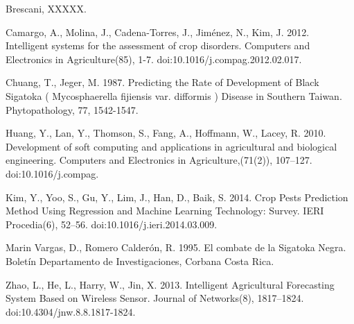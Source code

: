 \documentclass[review]{elsarticle}
\begin{document}
\begin{thebibliography}{1}

 Brescani, XXXXX.

 Camargo, A., Molina, J., Cadena-Torres, J., Jim\'enez, N., Kim, J. 2012. Intelligent systems for the assessment of crop disorders. Computers and Electronics in Agriculture(85), 1-7. doi:10.1016/j.compag.2012.02.017.

 Chuang, T., Jeger, M. 1987. Predicting the Rate of Development of Black Sigatoka ( Mycosphaerella fijiensis var. difformis ) Disease in Southern Taiwan. Phytopathology, 77, 1542-1547.

 Huang, Y., Lan, Y., Thomson, S., Fang, A., Hoffmann, W., Lacey, R. 2010. Development of soft computing and applications in agricultural and biological engineering. Computers and Electronics in Agriculture,(71(2)), 107–127. doi:10.1016/j.compag.

 Kim, Y., Yoo, S., Gu, Y., Lim, J., Han, D.,  Baik, S. 2014. Crop Pests Prediction Method Using Regression and Machine Learning Technology: Survey. IERI Procedia(6), 52–56. doi:10.1016/j.ieri.2014.03.009.

 Marin Vargas, D., Romero Calderón, R. 1995. El combate de la Sigatoka Negra. Bolet\'in Departamento de Investigaciones, Corbana Costa Rica.

Zhao, L., He, L., Harry, W., Jin, X. 2013. Intelligent Agricultural Forecasting System Based on Wireless Sensor. Journal of Networks(8), 1817–1824. doi:10.4304/jnw.8.8.1817-1824.

\end{thebibliography}
\end{document}
